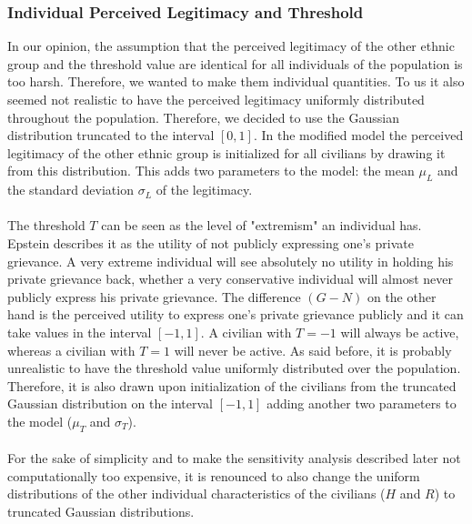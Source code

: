 \documentclass[11pt]{article}
\begin{document}
\subsubsection{Individual Perceived Legitimacy and Threshold}
In our opinion, the assumption that the perceived legitimacy of the other ethnic group and the threshold value are identical for all individuals of the population is too harsh. Therefore, we wanted to make them individual quantities. To us it also seemed not realistic to have the perceived legitimacy uniformly distributed throughout the population. Therefore, we decided to use the Gaussian distribution truncated to the interval $[0,1]$. In the modified model the perceived legitimacy of the other ethnic group is initialized for all civilians by drawing it from this distribution. This adds two parameters to the model: the mean $\mu_L$ and the standard deviation $\sigma_L$ of the legitimacy.\\
\\
The threshold $T$ can be seen as the level of "extremism" an individual has. Epstein describes it as the utility of not publicly expressing one's private grievance. A very extreme individual will see absolutely no utility in holding his private grievance back, whether a very conservative individual will almost never publicly express his private grievance. The difference $(G-N)$ on the other hand is the perceived utility to express one's private grievance publicly and it can take values in the interval $[-1,1]$. A civilian with $T = -1$ will always be active, whereas a civilian with $T = 1$ will never be active. As said before, it is probably unrealistic to have the threshold value uniformly distributed over the population. Therefore, it is also drawn upon initialization of the civilians from the truncated Gaussian distribution on the interval $[-1,1]$ adding another two parameters to the model ($\mu_T$ and $\sigma_T$).\\
\\
For the sake of simplicity and to make the sensitivity analysis described later not computationally too expensive, it is renounced to also change the uniform distributions of the other individual characteristics of the civilians ($H$ and $R$) to truncated Gaussian distributions.
\end{document}
